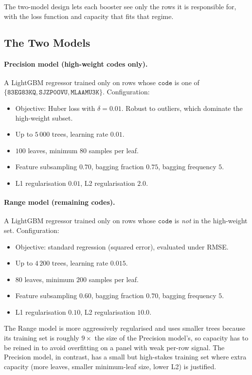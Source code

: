 The two-model design lets each booster see only the rows it is responsible for, with the loss function and capacity that fits that regime.

\subsection{The Two Models}
\label{sec:two_model:models}

\paragraph{Precision model (high-weight codes only).}
A LightGBM regressor trained only on rows whose $\mathtt{code}$ is one of $\{\mathtt{83EG83KQ}, \mathtt{SJZP0OVU}, \mathtt{MLAAMU3K}\}$. Configuration:

\begin{itemize}
  \item Objective: Huber loss with $\delta = 0.01$. Robust to outliers, which dominate the high-weight subset.
  \item Up to $5\,000$ trees, learning rate $0.01$.
  \item $100$ leaves, minimum $80$ samples per leaf.
  \item Feature subsampling $0.70$, bagging fraction $0.75$, bagging frequency $5$.
  \item L1 regularisation $0.01$, L2 regularisation $2.0$.
\end{itemize}

\paragraph{Range model (remaining codes).}
A LightGBM regressor trained only on rows whose $\mathtt{code}$ is \emph{not} in the high-weight set. Configuration:

\begin{itemize}
  \item Objective: standard regression (squared error), evaluated under RMSE.
  \item Up to $4\,200$ trees, learning rate $0.015$.
  \item $80$ leaves, minimum $200$ samples per leaf.
  \item Feature subsampling $0.60$, bagging fraction $0.70$, bagging frequency $5$.
  \item L1 regularisation $0.10$, L2 regularisation $10.0$.
\end{itemize}

The Range model is more aggressively regularised and uses smaller trees because its training set is roughly $9\times$ the size of the Precision model's, so capacity has to be reined in to avoid overfitting on a panel with weak per-row signal. The Precision model, in contrast, has a small but high-stakes training set where extra capacity (more leaves, smaller minimum-leaf size, lower L2) is justified.

